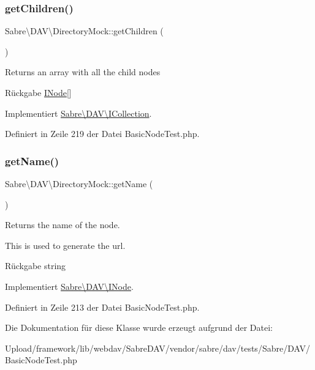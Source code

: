 \subsubsection{\texorpdfstring{get\+Children()}{getChildren()}}
{\footnotesize\ttfamily Sabre\textbackslash{}\+D\+A\+V\textbackslash{}\+Directory\+Mock\+::get\+Children (\begin{DoxyParamCaption}{ }\end{DoxyParamCaption})}

Returns an array with all the child nodes

\begin{DoxyReturn}{Rückgabe}
\mbox{\hyperlink{interface_sabre_1_1_d_a_v_1_1_i_node}{I\+Node}}\mbox{[}\mbox{]} 
\end{DoxyReturn}


Implementiert \mbox{\hyperlink{interface_sabre_1_1_d_a_v_1_1_i_collection_a5344a6890e49fd7a81bb0e38b4c6d0be}{Sabre\textbackslash{}\+D\+A\+V\textbackslash{}\+I\+Collection}}.



Definiert in Zeile 219 der Datei Basic\+Node\+Test.\+php.

\mbox{\label{class_sabre_1_1_d_a_v_1_1_directory_mock_af234ab67cb7373a91e5f6f00ba3fd502}} 
\subsubsection{\texorpdfstring{get\+Name()}{getName()}}
{\footnotesize\ttfamily Sabre\textbackslash{}\+D\+A\+V\textbackslash{}\+Directory\+Mock\+::get\+Name (\begin{DoxyParamCaption}{ }\end{DoxyParamCaption})}

Returns the name of the node.

This is used to generate the url.

\begin{DoxyReturn}{Rückgabe}
string 
\end{DoxyReturn}


Implementiert \mbox{\hyperlink{interface_sabre_1_1_d_a_v_1_1_i_node_ab616fe836b1ae36af12126a2bc934dce}{Sabre\textbackslash{}\+D\+A\+V\textbackslash{}\+I\+Node}}.



Definiert in Zeile 213 der Datei Basic\+Node\+Test.\+php.



Die Dokumentation für diese Klasse wurde erzeugt aufgrund der Datei\+:\begin{DoxyCompactItemize}
\item 
Upload/framework/lib/webdav/\+Sabre\+D\+A\+V/vendor/sabre/dav/tests/\+Sabre/\+D\+A\+V/Basic\+Node\+Test.\+php\end{DoxyCompactItemize}
